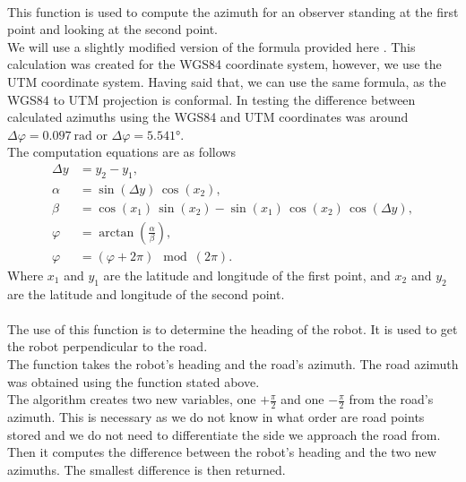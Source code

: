         \\
            This function is used to compute the azimuth for an observer standing at the first point and looking at the second point.\\
            We will use a slightly modified version of the formula provided here \cite{calc_bearing}. This calculation was created for the WGS84 coordinate system, however, we use the UTM coordinate system. Having said that, we can use the same formula, as the WGS84 to UTM projection is conformal\cite{Map_projections}. In testing the difference between calculated azimuths using the WGS84 and UTM coordinates was around $\Delta\varphi=0.097\:\si{\radian}$ or $\Delta\varphi=5.541\si{\degree}$.\\
            The computation equations are as follows
            \begin{align}
                \Delta y &= y_{2} - y_{1}, \\
                \alpha &= \sin{(\Delta y)}\,\cos{(x_{2})}, \\
                \beta &= \cos{(x_{1})}\,\sin{(x_{2})} - \sin{(x_{1})}\,\cos{(x_{2})}\,\cos{(\Delta y)}, \\
                \varphi &= \arctan{\left(\frac{\alpha}{\beta}\right)}, \\
                \varphi &= (\varphi + 2\pi) \mod (2\pi).
            \end{align}
            Where $x_{1}$ and $y_{1}$ are the latitude and longitude of the first point, and $x_{2}$ and $y_{2}$ are the latitude and longitude of the second point.\\
        \\
            The use of this function is to determine the heading of the robot. It is used to get the robot perpendicular to the road.\\
            The function takes the robot's heading and the road's azimuth. The road azimuth was obtained using the function stated above.\\
            The algorithm creates two new variables, one $+\frac{\pi}{2}$ and one $-\frac{\pi}{2}$ from the road's azimuth. This is necessary as we do not know in what order are road points stored and we do not need to differentiate the side we approach the road from.\\
            Then it computes the difference between the robot's heading and the two new azimuths. The smallest difference is then returned.
    

